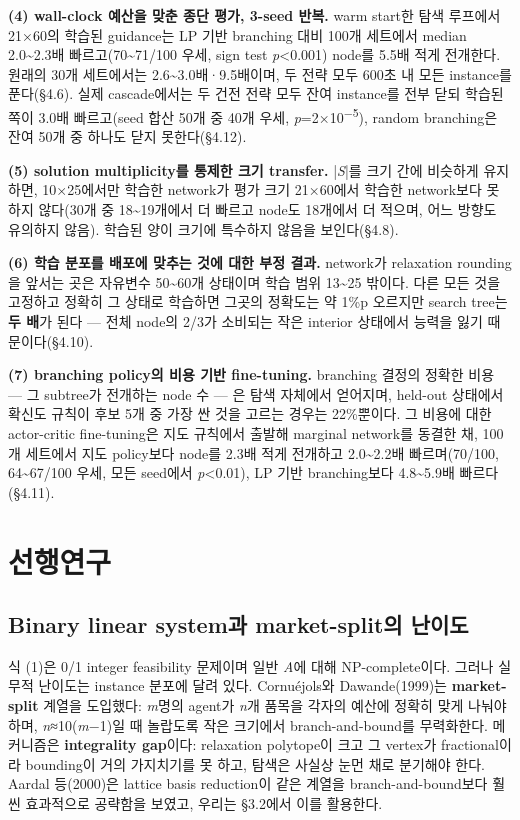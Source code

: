 \documentclass[final,5p,twocolumn]{elsarticle}
\begin{document}
\textbf{(4) wall-clock 예산을 맞춘 종단 평가, 3-seed 반복.} warm start한 탐색 루프에서 21×60의 학습된 guidance는 LP 기반 branching 대비 100개 세트에서 median 2.0\textasciitilde{}2.3배 빠르고(70\textasciitilde{}71/100 우세, sign test \textit{p}<0.001) node를 5.5배 적게 전개한다. 원래의 30개 세트에서는 2.6\textasciitilde{}3.0배·9.5배이며, 두 전략 모두 600초 내 모든 instance를 푼다(§4.6). 실제 cascade에서는 두 건전 전략 모두 잔여 instance를 전부 닫되 학습된 쪽이 3.0배 빠르고(seed 합산 50개 중 40개 우세, \textit{p}=2×10\textsuperscript{−5}), random branching은 잔여 50개 중 하나도 닫지 못한다(§4.12).

\textbf{(5) solution multiplicity를 통제한 크기 transfer.} |\textit{S}|를 크기 간에 비슷하게 유지하면, 10×25에서만 학습한 network가 평가 크기 21×60에서 학습한 network보다 못하지 않다(30개 중 18\textasciitilde{}19개에서 더 빠르고 node도 18개에서 더 적으며, 어느 방향도 유의하지 않음). 학습된 양이 크기에 특수하지 않음을 보인다(§4.8).

\textbf{(6) 학습 분포를 배포에 맞추는 것에 대한 부정 결과.} network가 relaxation rounding을 앞서는 곳은 자유변수 50\textasciitilde{}60개 상태이며 학습 범위 13\textasciitilde{}25 밖이다. 다른 모든 것을 고정하고 정확히 그 상태로 학습하면 그곳의 정확도는 약 1\%p 오르지만 search tree는 \textbf{두 배}가 된다 — 전체 node의 2/3가 소비되는 작은 interior 상태에서 능력을 잃기 때문이다(§4.10).

\textbf{(7) branching policy의 비용 기반 fine-tuning.} branching 결정의 정확한 비용 — 그 subtree가 전개하는 node 수 — 은 탐색 자체에서 얻어지며, held-out 상태에서 확신도 규칙이 후보 5개 중 가장 싼 것을 고르는 경우는 22\%뿐이다. 그 비용에 대한 actor-critic fine-tuning은 지도 규칙에서 출발해 marginal network를 동결한 채, 100개 세트에서 지도 policy보다 node를 2.3배 적게 전개하고 2.0\textasciitilde{}2.2배 빠르며(70/100, 64\textasciitilde{}67/100 우세, 모든 seed에서 \textit{p}<0.01), LP 기반 branching보다 4.8\textasciitilde{}5.9배 빠르다(§4.11).

\section{선행연구}
\subsection{Binary linear system과 market-split의 난이도}
식 (1)은 0/1 integer feasibility 문제이며 일반 \textit{A}에 대해 NP-complete이다. 그러나 실무적 난이도는 instance 분포에 달려 있다. Cornuéjols와 Dawande(1999)는 \textbf{market-split} 계열을 도입했다: \textit{m}명의 agent가 \textit{n}개 품목을 각자의 예산에 정확히 맞게 나눠야 하며, \textit{n}≈10(\textit{m}−1)일 때 놀랍도록 작은 크기에서 branch-and-bound를 무력화한다. 메커니즘은 \textbf{integrality gap}이다: relaxation polytope이 크고 그 vertex가 fractional이라 bounding이 거의 가지치기를 못 하고, 탐색은 사실상 눈먼 채로 분기해야 한다. Aardal 등(2000)은 lattice basis reduction이 같은 계열을 branch-and-bound보다 훨씬 효과적으로 공략함을 보였고, 우리는 §3.2에서 이를 활용한다.
\end{document}

